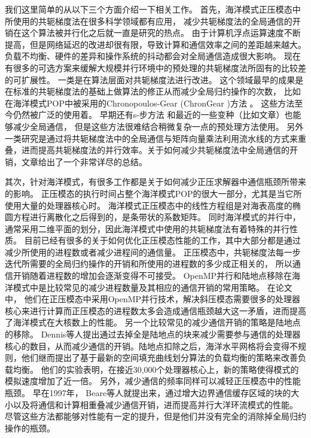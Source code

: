 我们这里简单的从以下三个方面介绍一下相关工作。
首先，海洋模式正压模态中所使用的共轭梯度法在很多科学领域都有应用，
减少共轭梯度法的全局通信的开销在这个算法被并行化之后就一直是研究的热点。 
由于计算机浮点运算速度不断提高，但是网络延迟的改进却很有限，导致计算和通信效率之间的差距越来越大。
负载不均衡、硬件的差异和操作系统的抖动都会对全局通信造成很大影响\cite{ghysels2014}。 
现在有很多的可选方案来缓解大规模并行环境中的预处理的共轭梯度法所固有的比较差的可扩展性。
一类是在算法层面对共轭梯度法进行改进。 
这个领域最早的成果是在标准的共轭梯度法的基础上做算法的修正从而减少全局归约操作的次数， 比如在海洋模式POP中被采用的Chronopoulos-Gear (ChronGear \cite{dAzevedo1999lapack})方法 。 这些方法至今仍然被广泛的使用着。 
早期还有s-步方法\cite{chron1989} 和最近的一些变种（比如文章）也能够减少全局通信， 但是这些方法很难结合稍微复杂一点的预处理方法使用。
另外一类研究是通过将共轭梯度法中的全局通信与矩阵向量乘法利用流水线的方式来重叠，进而提高共轭梯度法的并行效率。关于如何减少共轭梯度法中全局通信的开销，文章给出了一个非常详尽的总结。
 



其次，针对海洋模式，有很多工作都是关于如何减少正压求解器中通信瓶颈所带来的影响。
正压模态的执行时间占整个海洋模式POP的很大一部分，尤其是当它所使用大量的处理器核心时。
海洋模式正压模态中的线性方程组是对海表高度的椭圆方程进行离散化之后得到的，是条带状的系数矩阵。
同时海洋模式的并行中，通常采用二维平面的划分，因此海洋模式中使用的共轭梯度法有着特殊的并行性质。
目前已经有很多的关于如何优化正压模态性能的工作，其中大部分都是通过减少所使用的进程数或者减少进程间的通信量。 
正压模态中，共轭梯度法每一步迭代所需要的全局归约操作的开销和所使用的进程数的多少成正相关的， 所以通信开销随着进程数的增加会逐渐变得不可接受。
OpenMP并行和陆地点移除在海洋模式中是比较常见的减少进程数量及其相应的通信开销的常用策略。  
在论文中， 他们在正压模态中采用OpenMP并行技术，解决斜压模态需要很多的处理器核心来进行计算而正压模态的进程数太多会造成通信瓶颈越大这一矛盾，进而提高了海洋模式在大核数上的性能。 
另一个比较常见的减少通信开销的策略是陆地点的移除\cite{dennis2007inverse,dennis2008scaling}。 
Dennis等人提出通过去掉全是陆地点的块来减少需要参与通信的处理器核心的数目，从而减少通信的开销。陆地点扣除之后，海洋水平网格将会变得不规则，他们继而提出了基于最新的空间填充曲线划分算法的负载均衡的策略来改善负载均衡。 
他们的实验表明，在接近30,000个处理器核心上，新的策略使得模式的模拟速度增加了近一倍。 
另外，减少通信的频率同样可以减轻正压模态中的性能瓶颈。 
早在1997年，  Beare\cite{beare1997optimisation}等人就提出来，通过增大边界通信缓存区域的块的大小以及将通信和计算相重叠减少通信开销，进而提高并行大洋环流模式的性能。  
尽管这些方法都能够对性能有一定的提升，但是他们并没有完全的消除掉全局归约操作的瓶颈。 

